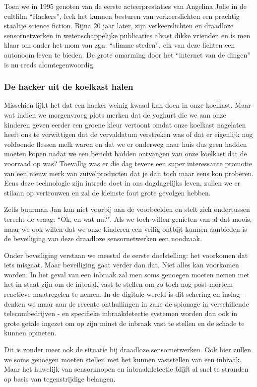 \documentclass[DIV=calc,paper=a4,fontsize=11pt,twocolumn,draft]{scrartcl}
\newcommand{\heading}[1]{
\subsubsection*{#1}
\vspace{-2mm}
}
\begin{document}
Toen we in 1995 genoten van de eerste acteerprestaties van Angelina Jolie in de
cultfilm ``Hackers'', leek het kunnen besturen van verkeerslichten een prachtig
staaltje science fiction. Bijna 20 jaar later, zijn verkeerslichten en
draadloze sensornetwerken in wetenschappelijke publicaties alvast dikke
vrienden en is men klaar om onder het mom van zgn. ``slimme steden'', elk van
deze lichten een autonoom leven te bieden. De grote omarming door het
``internet van de dingen'' is nu reeds alomtegenwoordig.

\heading{De hacker uit de koelkast halen}

Misschien lijkt het dat een hacker weinig kwaad kan doen in onze koelkast. Maar
wat indien we morgenvroeg plots merken dat de yoghurt die we aan onze kinderen
geven eerder een groene kleur vertoont omdat onze koelkast nagelaten heeft ons
te verwittigen dat de vervaldatum verstreken was of dat er eigenlijk nog
voldoende flessen melk waren en dat we er onderweg naar huis dus geen hadden
moeten kopen nadat we een bericht hadden ontvangen van onze koelkast dat de
voorraad op was? Toevallig was er die dag tevens een super interessante
promotie van een nieuw merk van zuivelproducten dat je dan toch maar eens kon
proberen. Eens deze technologie zijn intrede doet in ons dagdagelijks leven,
zullen we er stilaan op vertrouwen en zal de kleinste fout grote gevolgen
hebben.

Zelfs buurman Jan kan niet voorbij aan de voorbeelden en stelt zich ondertussen
terecht de vraag: ``Ok, en wat nu?''. Als we toch willen genieten van al dat
moois, maar we ook willen dat we onze kinderen een veilig ontbijt kunnen
aanbieden is de beveiliging van deze draadloze sensornetwerken een noodzaak.

Onder beveiliging verstaan we meestal de eerste doelstelling: het voorkomen dat
iets misgaat. Maar beveiliging gaat verder dan dat. Niet alles kan voorkomen
worden. In het geval van een inbraak zal men soms genoegen moeten nemen met het
in staat zijn om de inbraak vast te stellen om zo toch nog post-mortem
reactieve maatregelen te nemen. In de digitale wereld is dit schering en inslag
- denken we maar aan de recente onthullingen in zake de spionage in
verschillende telecombedrijven - en specifieke inbraakdetectie systemen worden
dan ook in grote getale ingezet om op zijn minst de inbraak vast te stellen en
de schade te kunnen opmeten.

Dit is zonder meer ook de situatie bij draadloze sensornetwerken. Ook hier
zullen we soms genoegen moeten stellen met het kunnen vaststellen van een
inbraak. Maar het huwelijk van sensorknopen en inbraakdetectie blijft al snel
te stranden op basis van tegenstrijdige belangen.
\end{document}
